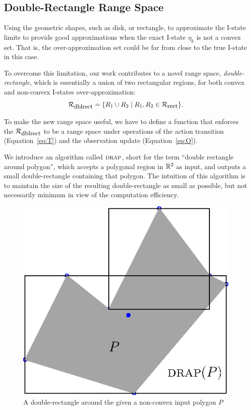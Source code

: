 \subsection{Double-Rectangle Range Space}
\label{subsec:dblrect}
Using the geometric shapes, such as disk, or rectangle, to
approximate the I-state limits to provide good approximations
when the exact I-state $\eta_k$ is not a convex set. 
That is, the over-approximation set could be far from close to the true I-state in this case.

To overcome this limitation, our work contributes to a novel range space,
\emph{double-rectangle}, which is essentially a union of two rectangular
regions, for both convex and non-convex I-states over-approximation:
\begin{equation}
  \mathcal{R}_{\mbox{\small dblrect}} = \{ R_1 \cup R_2 \mid R_1, R_2 \in \mathcal{R}_{\mbox{\small rect}} \}.
\end{equation}

To make the new range space useful, we have to define a function that enforces the $\mathcal{R}_{\mbox{\small dblrect}}$ 
to be a range space under operations of the action transition (Equation~\ref{eq:T}) 
and the observation update (Equation~\ref{eq:O}).

We introduce an algorithm called $\textsc{drap}$, short for the term ``double rectangle
around polygon'', which accepts a polygonal region in $\mathbb{R}^2$ as input, and
outputs a small double-rectangle containing that polygon.  
%
The intuition of this algorithm is to maintain the size of the resulting double-rectangle as small
as possible, but not necessarily minimum in view of the computation efficiency.

\begin{figure} 
  \centering
  \includegraphics[scale=1]{figs/doublerect}
  \caption{A double-rectangle around the given a non-convex input polygon $P$}
  \label{fig:drap}
\end{figure}

